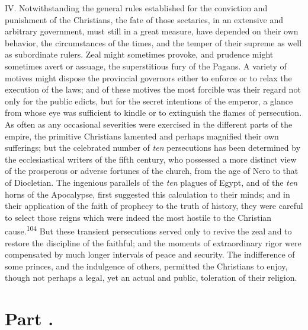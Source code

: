 IV. Notwithstanding the general rules established for the
conviction and punishment of the Christians, the fate of those
sectaries, in an extensive and arbitrary government, must still
in a great measure, have depended on their own behavior, the
circumstances of the times, and the temper of their supreme as
well as subordinate rulers. Zeal might sometimes provoke, and
prudence might sometimes avert or assuage, the superstitious fury
of the Pagans. A variety of motives might dispose the provincial
governors either to enforce or to relax the execution of the
laws; and of these motives the most forcible was their regard not
only for the public edicts, but for the secret intentions of the
emperor, a glance from whose eye was sufficient to kindle or to
extinguish the flames of persecution. As often as any occasional
severities were exercised in the different parts of the empire,
the primitive Christians lamented and perhaps magnified their own
sufferings; but the celebrated number of \textit{ten} persecutions has
been determined by the ecclesiastical writers of the fifth
century, who possessed a more distinct view of the prosperous or
adverse fortunes of the church, from the age of Nero to that of
Diocletian. The ingenious parallels of the \textit{ten} plagues of
Egypt, and of the \textit{ten} horns of the Apocalypse, first suggested
this calculation to their minds; and in their application of the
faith of prophecy to the truth of history, they were careful to
select those reigns which were indeed the most hostile to the
Christian cause.\textsuperscript{104} But these transient persecutions served only
to revive the zeal and to restore the discipline of the faithful;
and the moments of extraordinary rigor were compensated by much
longer intervals of peace and security. The indifference of some
princes, and the indulgence of others, permitted the Christians
to enjoy, though not perhaps a legal, yet an actual and public,
toleration of their religion.


\section{Part \thesection.}

